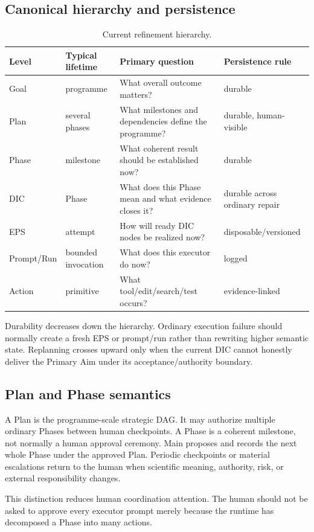 \documentclass[11pt,a4paper]{article}
\begin{document}
\subsection{Canonical hierarchy and persistence}
\begin{table}[H]
\centering\small
\begin{tabularx}{\textwidth}{@{}l l Y Y@{}}
\toprule
Level & Typical lifetime & Primary question & Persistence rule\\
\midrule
Goal & programme & What overall outcome matters? & durable\\
Plan & several phases & What milestones and dependencies define the programme? & durable, human-visible\\
Phase & milestone & What coherent result should be established now? & durable\\
DIC & Phase & What does this Phase mean and what evidence closes it? & durable across ordinary repair\\
EPS & attempt & How will ready DIC nodes be realized now? & disposable/versioned\\
Prompt/Run & bounded invocation & What does this executor do now? & logged\\
Action & primitive & What tool/edit/search/test occurs? & evidence-linked\\
\bottomrule
\end{tabularx}
\caption{Current refinement hierarchy.}
\end{table}

Durability decreases down the hierarchy. Ordinary execution failure should normally create a fresh EPS or prompt/run rather than rewriting higher semantic state. Replanning crosses upward only when the current DIC cannot honestly deliver the Primary Aim under its acceptance/authority boundary.

\subsection{Plan and Phase semantics}
A Plan is the programme-scale strategic DAG. It may authorize multiple ordinary Phases between human checkpoints. A Phase is a coherent milestone, not normally a human approval ceremony. Main proposes and records the next whole Phase under the approved Plan. Periodic checkpoints or material escalations return to the human when scientific meaning, authority, risk, or external responsibility changes.

This distinction reduces human coordination attention. The human should not be asked to approve every executor prompt merely because the runtime has decomposed a Phase into many actions.
\end{document}
